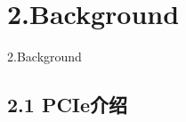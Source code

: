 \documentclass[10pt]{ctexbeamer}
\begin{document}

\section[2.Background]{2.Background}\label{sec:2}
\begin{frame}
  \begin{center}
    \Huge 2.Background
  \end{center}
\end{frame}
\subsection{2.1 PCIe介绍}\label{sec:2-1}
\end{document}

